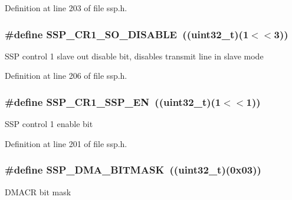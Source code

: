 Definition at line 203 of file ssp.\+h.

\subsubsection[{\texorpdfstring{S\+S\+P\+\_\+\+C\+R1\+\_\+\+S\+O\+\_\+\+D\+I\+S\+A\+B\+LE}{SSP_CR1_SO_DISABLE}}]{\setlength{\rightskip}{0pt plus 5cm}\#define S\+S\+P\+\_\+\+C\+R1\+\_\+\+S\+O\+\_\+\+D\+I\+S\+A\+B\+LE~(({\bf uint32\+\_\+t})(1$<$$<$3))}\hypertarget{group___s_s_p___private___macros_gaf8cd75ca0bf07a236b992cca4769b4dc}{}\label{group___s_s_p___private___macros_gaf8cd75ca0bf07a236b992cca4769b4dc}
S\+SP control 1 slave out disable bit, disables transmit line in slave mode 

Definition at line 206 of file ssp.\+h.

\subsubsection[{\texorpdfstring{S\+S\+P\+\_\+\+C\+R1\+\_\+\+S\+S\+P\+\_\+\+EN}{SSP_CR1_SSP_EN}}]{\setlength{\rightskip}{0pt plus 5cm}\#define S\+S\+P\+\_\+\+C\+R1\+\_\+\+S\+S\+P\+\_\+\+EN~(({\bf uint32\+\_\+t})(1$<$$<$1))}\hypertarget{group___s_s_p___private___macros_gaad500ed8cec6c1734a12a7f55ff6ec26}{}\label{group___s_s_p___private___macros_gaad500ed8cec6c1734a12a7f55ff6ec26}
S\+SP control 1 enable bit 

Definition at line 201 of file ssp.\+h.

\subsubsection[{\texorpdfstring{S\+S\+P\+\_\+\+D\+M\+A\+\_\+\+B\+I\+T\+M\+A\+SK}{SSP_DMA_BITMASK}}]{\setlength{\rightskip}{0pt plus 5cm}\#define S\+S\+P\+\_\+\+D\+M\+A\+\_\+\+B\+I\+T\+M\+A\+SK~(({\bf uint32\+\_\+t})(0x03))}\hypertarget{group___s_s_p___private___macros_ga7ba88e5e9bd61c60806ce262fcc8838a}{}\label{group___s_s_p___private___macros_ga7ba88e5e9bd61c60806ce262fcc8838a}
D\+M\+A\+CR bit mask 

